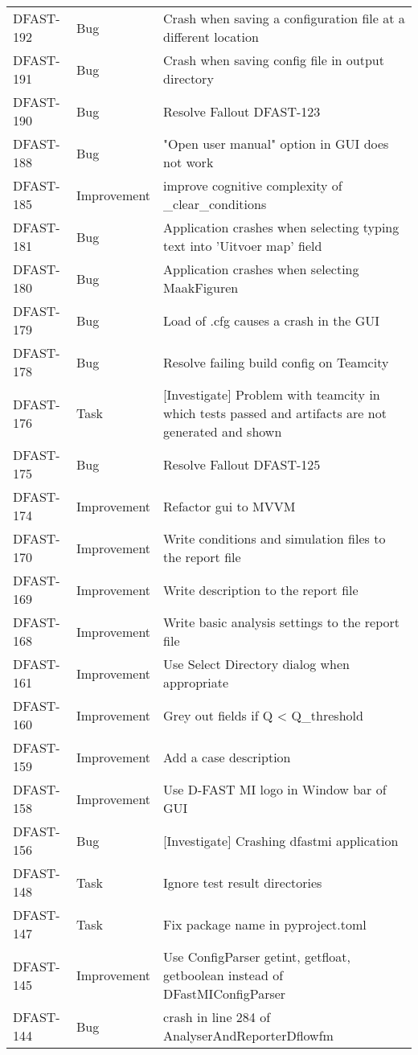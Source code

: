 \documentclass[git]{deltares_manual}
\begin{document}
\begin{longtable}{l|l|p{8cm}}
DFAST-192 & Bug & Crash when saving a configuration file at a different location \\
DFAST-191 & Bug & Crash when saving config file in output directory \\
DFAST-190 & Bug & Resolve Fallout DFAST-123 \\
DFAST-188 & Bug & "Open user manual" option in GUI does not work \\
DFAST-185 & Improvement & improve cognitive complexity of \_clear\_conditions \\
DFAST-181 & Bug & Application crashes when selecting typing text into 'Uitvoer map' field \\
DFAST-180 & Bug & Application crashes when selecting MaakFiguren \\
DFAST-179 & Bug & Load of .cfg causes a crash in the GUI \\
DFAST-178 & Bug & Resolve failing build config on Teamcity \\
DFAST-176 & Task & [Investigate] Problem with teamcity in which tests passed and artifacts are not generated and shown \\
DFAST-175 & Bug & Resolve Fallout DFAST-125  \\
DFAST-174 & Improvement & Refactor gui to MVVM \\
DFAST-170 & Improvement & Write conditions and simulation files to the report file \\
DFAST-169 & Improvement & Write description to the report file \\
DFAST-168 & Improvement & Write basic analysis settings to the report file \\
DFAST-161 & Improvement & Use Select Directory dialog when appropriate \\
DFAST-160 & Improvement & Grey out fields if Q < Q\_threshold \\
DFAST-159 & Improvement & Add a case description \\
DFAST-158 & Improvement & Use D-FAST MI logo in Window bar of GUI \\
DFAST-156 & Bug & [Investigate] Crashing dfastmi application \\
DFAST-148 & Task & Ignore test result directories \\
DFAST-147 & Task & Fix package name in pyproject.toml \\
DFAST-145 & Improvement & Use ConfigParser getint, getfloat, getboolean instead of DFastMIConfigParser \\
DFAST-144 & Bug & crash in line 284 of AnalyserAndReporterDflowfm \\

\end{longtable}
\end{document}
